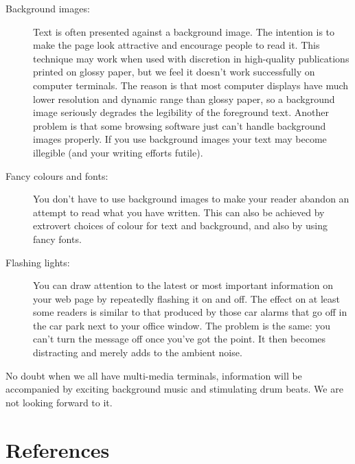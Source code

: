 \documentclass[twoside,11pt,nolof]{starlink}
\begin{document}
\begin{description}

\item [Background images:]

Text is often presented against a background image.
The intention is to make the page look attractive and encourage people to
read it.
This technique may work when used with discretion in high-quality publications
printed on glossy paper, but we feel it doesn't work successfully on computer
terminals.
The reason is that most computer displays have much lower resolution and
dynamic range than glossy paper, so a background image seriously degrades the
legibility of the foreground text.
Another problem is that some browsing software just can't handle background
images properly.
If you use background images your text may become illegible (and your writing
efforts futile).

\item [Fancy colours and fonts:]

You don't have to use background images to make your reader abandon an
attempt to read what you have written.
This can also be achieved by extrovert choices of colour for text and
background, and also by using fancy fonts.

\item [Flashing lights:]

You can draw attention to the latest or most important information on your web
page by repeatedly flashing it on and off.
The effect on at least some readers is similar to that produced by those car
alarms that go off in the car park next to your office window.
The problem is the same: you can't turn the message off once you've got the
point.
It then becomes distracting and merely adds to the ambient noise.

\end{description}

No doubt when we all have multi-media terminals, information will be
accompanied by exciting background music and stimulating drum beats.
We are not looking forward to it.

\section{References}
\end{document}
